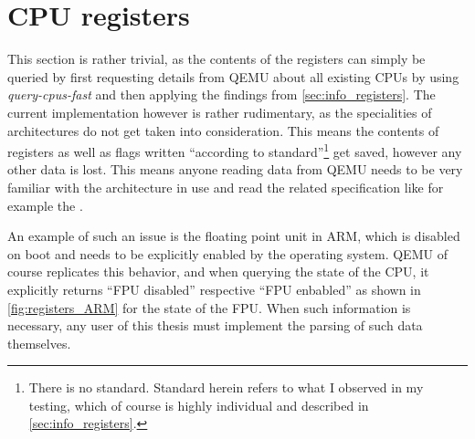 \section{CPU registers}
This section is rather trivial, as the contents of the registers can simply be queried
by first requesting details from QEMU about all existing CPUs by using \emph{query-cpus-fast}
and then applying the findings from \autoref{sec:info_registers}.
The current implementation however is rather rudimentary,
as the specialities of architectures do not get taken into consideration.
This means the contents of registers as well as flags written
\enquote{according to standard}\footnote{There is no standard. Standard herein refers to what I observed in my testing, which of course is highly individual and described in \autoref{sec:info_registers}.}
get saved, however any other data is lost.
This means anyone reading data from QEMU needs to be very familiar with the architecture in use
and read the related specification like for example the \cite{intel-manual}.

An example of such an issue is the floating point unit in ARM,
which is disabled on boot and needs to be explicitly enabled by the operating system.
QEMU of course replicates this behavior,
and when querying the state of the CPU, it explicitly returns
\enquote{FPU disabled} respective \enquote{FPU enbabled}
as shown in \autoref{fig:registers_ARM} for the state of the FPU.
When such information is necessary, any user of this thesis must implement the parsing of such data themselves.

